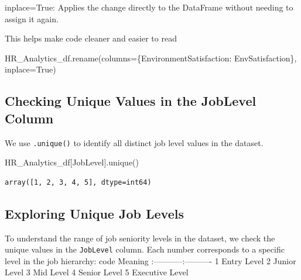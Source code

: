 \documentclass[
  letterpaper,
  DIV=11,
  numbers=noendperiod]{scrartcl}
\newenvironment{Shaded}{\begin{snugshade}}{\end{snugshade}}
\newcommand{\NormalTok}[1]{\textcolor[rgb]{0.00,0.23,0.31}{#1}}
\newcommand{\OperatorTok}[1]{\textcolor[rgb]{0.37,0.37,0.37}{#1}}
\newcommand{\StringTok}[1]{\textcolor[rgb]{0.13,0.47,0.30}{#1}}
\newcommand{\VariableTok}[1]{\textcolor[rgb]{0.07,0.07,0.07}{#1}}
\begin{document}
inplace=True: Applies the change directly to the DataFrame without
needing to assign it again.

This helps make code cleaner and easier to read

\begin{Shaded}
\begin{Highlighting}[]
\NormalTok{HR\_Analytics\_df.rename(columns}\OperatorTok{=}\NormalTok{\{}\StringTok{\textquotesingle{}EnvironmentSatisfaction\textquotesingle{}}\NormalTok{: }\StringTok{\textquotesingle{}EnvSatisfaction\textquotesingle{}}\NormalTok{\}, inplace}\OperatorTok{=}\VariableTok{True}\NormalTok{)}
\end{Highlighting}
\end{Shaded}

\subsection{Checking Unique Values in the JobLevel
Column}\label{checking-unique-values-in-the-joblevel-column}

We use \texttt{.unique()} to identify all distinct job level values in
the dataset.

\begin{Shaded}
\begin{Highlighting}[]
\NormalTok{HR\_Analytics\_df[}\StringTok{\textquotesingle{}JobLevel\textquotesingle{}}\NormalTok{].unique()}
\end{Highlighting}
\end{Shaded}

\begin{verbatim}
array([1, 2, 3, 4, 5], dtype=int64)
\end{verbatim}

\subsection{Exploring Unique Job
Levels}\label{exploring-unique-job-levels}

To understand the range of job seniority levels in the dataset, we check
the unique values in the \texttt{JobLevel} column. Each number
corresponds to a specific level in the job hierarchy: \textbar{} code
\textbar{} Meaning \textbar{}
\textbar:-----------\textbar:----------\textbar{} \textbar{} 1
\textbar Entry Level\textbar{} \textbar{} 2 \textbar{} Junior
Level\textbar{} \textbar{} 3 \textbar{} Mid Level\textbar{} \textbar{} 4
\textbar{} Senior Level\textbar{} \textbar{} 5 \textbar{} Executive
Level\textbar{}
\end{document}
